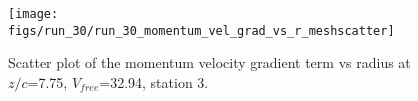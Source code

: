 \begin{figure}[H]
\centering
\texttt{[image: figs/run\_30/run\_30\_momentum\_vel\_grad\_vs\_r\_meshscatter]}
\caption{Scatter plot of the momentum velocity gradient term vs radius at $z/c$=7.75, $V_{free}$=32.94, station 3.}
\label{fig:run_30_momentum_vel_grad_vs_r_meshscatter}
\end{figure}


